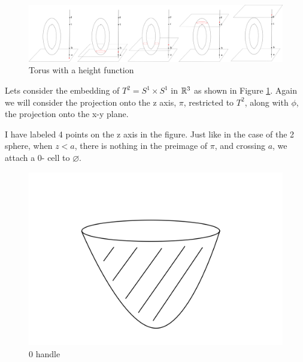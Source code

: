 \begin{figure}[h]
    \centering
    \includegraphics[width = .8\linewidth]{Images_Lect1/image.png}
    \caption{Torus with a height function}
    \label{fig:Torus}
\end{figure}
\begin{example}
Lets consider the embedding of $T^{2}= S^{1}\times S^{1}$ in $\mathbb{R}^{3}$ as shown in Figure \ref{fig:Torus}. Again we will consider the projection onto the z axis, $\pi$, restricted to $T^{2}$, along with $\phi$, the projection onto the x-y plane. 

I have labeled 4 points on the z axis in the figure. Just like in the case of the 2 sphere, when $z < a$, there is nothing in the preimage of $\pi$, and crossing $a$, we attach a 0- cell to $\varnothing$.
\begin{figure}[h]
    \centering
    \includegraphics[width = .4\linewidth]{Images_Lect1/2disc.jpeg}
    \caption{0 handle}
    \label{fig:0handleT}
\end{figure}


\end{example}
